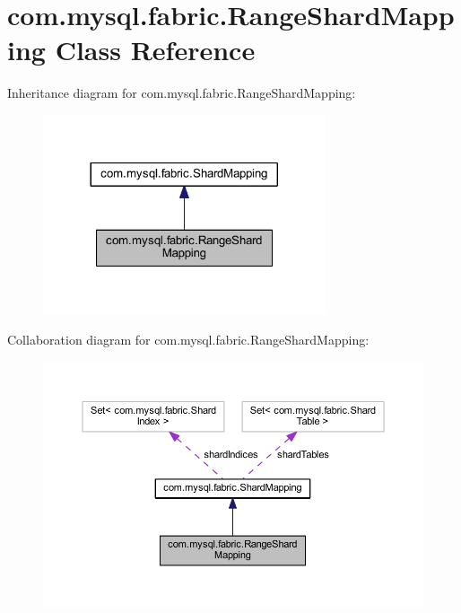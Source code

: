 \hypertarget{classcom_1_1mysql_1_1fabric_1_1_range_shard_mapping}{}\section{com.\+mysql.\+fabric.\+Range\+Shard\+Mapping Class Reference}
\label{classcom_1_1mysql_1_1fabric_1_1_range_shard_mapping}


Inheritance diagram for com.\+mysql.\+fabric.\+Range\+Shard\+Mapping\+:\nopagebreak
\begin{figure}[H]
\begin{center}
\leavevmode
\includegraphics[width=236pt]{classcom_1_1mysql_1_1fabric_1_1_range_shard_mapping__inherit__graph}
\end{center}
\end{figure}


Collaboration diagram for com.\+mysql.\+fabric.\+Range\+Shard\+Mapping\+:\nopagebreak
\begin{figure}[H]
\begin{center}
\leavevmode
\includegraphics[width=350pt]{classcom_1_1mysql_1_1fabric_1_1_range_shard_mapping__coll__graph}
\end{center}
\end{figure}
